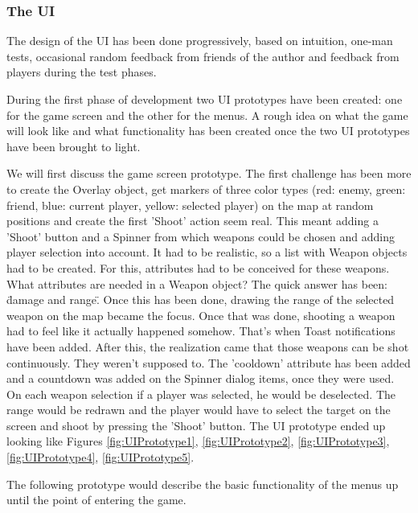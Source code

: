 \subsubsection{The UI}

The design of the UI has been done progressively, based on intuition, one-man
tests, occasional random feedback from friends of the author and feedback from
players during the test phases.\newline

During the first phase of development two UI prototypes have been created: one
for the game screen and the other for the menus. A rough idea on what the game
will look like and what functionality has been created once the two UI
prototypes have been brought to light.\newline

We will first discuss the game screen prototype. The first challenge has been
more to create the Overlay object, get markers of three color types (red: enemy,
green: friend, blue: current player, yellow: selected player) on the map at
random positions and create the first 'Shoot' action seem real. This meant
adding a 'Shoot' button and a Spinner from which weapons could be chosen and
adding player selection into account. It had to be realistic, so a list with
Weapon objects had to be created. For this, attributes had to be conceived for
these weapons. What attributes are needed in a Weapon object? The quick answer
has been: \"damage and range\". Once this has been done, drawing the range of
the selected weapon on the map became the focus. Once that was done, shooting a
weapon had to feel like it actually happened somehow. That's when Toast
notifications have been added. After this, the realization came that those
weapons can be shot continuously. They weren't supposed to. The 'cooldown'
attribute has been added and a countdown was added on the Spinner dialog items,
once they were used. On each weapon selection if a player was selected, he would
be deselected. The range would be redrawn and the player would have to select
the target on the screen and shoot by pressing the 'Shoot' button. The UI
prototype ended up looking like Figures \ref{fig:UIPrototype1},
\ref{fig:UIPrototype2}, \ref{fig:UIPrototype3}, \ref{fig:UIPrototype4},
\ref{fig:UIPrototype5}.\newline

The following prototype would describe the basic functionality of the menus up
until the point of entering the game.\newline


